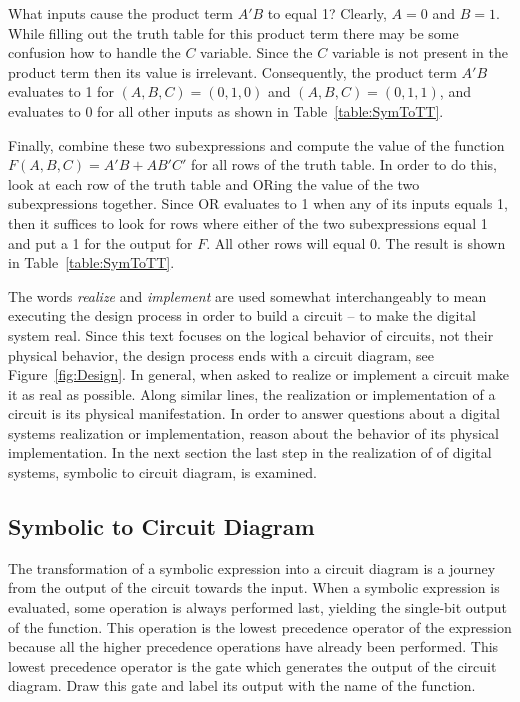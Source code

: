 What inputs cause the product term $A'B$ to equal 1?  Clearly, $A=0$ and $B=1$.
While filling out the truth table for this product term there may be some
confusion
how to handle the $C$ variable.  Since the $C$ variable is not present in the 
product term then its value is irrelevant. Consequently, the product term $A'B$
evaluates to 1 for $(A,B,C)=(0,1,0)$ and $(A,B,C)=(0,1,1)$, and evaluates to 0
for all other inputs as shown in Table~\ref{table:SymToTT}.

Finally, combine these two subexpressions and compute the value
of the function $F(A,B,C) = A'B + AB'C'$ for all rows of the truth table. In 
order to do this, look at each row of the truth table and ORing the value of 
the two
subexpressions together.  Since OR evaluates to 1 when any of its inputs equals
1, then it suffices to look for rows where either of the two subexpressions equal
1 and put a 1 for the output for $F$.  All other rows will equal 0.  The result 
is shown in Table~\ref{table:SymToTT}.

The words \textit{ realize} and \textit{implement}   
are used somewhat interchangeably to mean executing the design
process in order to build a circuit -- to make the digital system real.  
Since this text focuses on the logical 
behavior of circuits, not their physical behavior, the design process ends with
a circuit diagram, see Figure~\ref{fig:Design}.  In general, when asked
to realize or implement a circuit make it as real as 
possible.  Along similar lines, the realization or implementation of a circuit 
is its physical manifestation.  In order to answer questions about a 
digital systems realization or implementation, reason about the behavior of its 
physical implementation.  In the next section the last step in the realization
of of digital systems, symbolic to circuit diagram, is examined.


\subsection{Symbolic to Circuit Diagram}

The transformation of a symbolic expression into a circuit diagram is a journey
from the output of the circuit towards the input.  When a symbolic expression
is evaluated, some operation is always performed last, yielding
the single-bit output of the function.  This operation is the lowest 
precedence operator of the expression because all the higher precedence 
operations have already been performed.  This lowest precedence operator
is the gate which generates the output of the circuit diagram.  Draw this gate
and label its output with the name of the function.  


